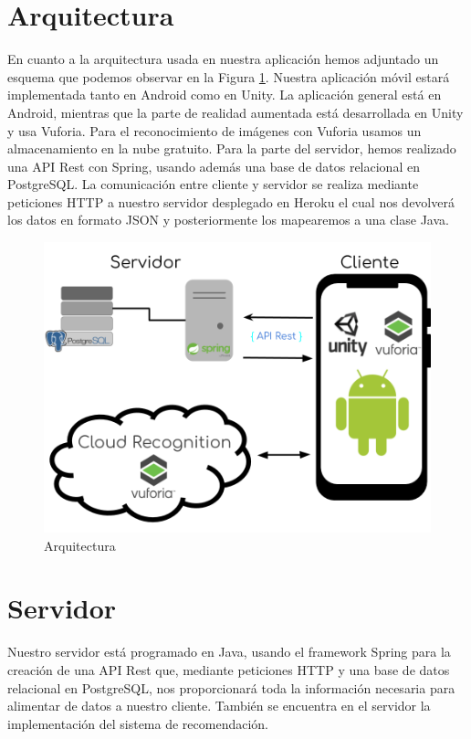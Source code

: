 \section{Arquitectura}
\label{makereference4.2}
En cuanto a la arquitectura usada en nuestra aplicación hemos adjuntado un esquema que podemos observar en la Figura \ref{fig:arquitectura}. Nuestra aplicación móvil estará implementada tanto en Android
como en Unity. La aplicación general está en Android, mientras que la parte de realidad aumentada está desarrollada en Unity y usa Vuforia. Para el reconocimiento
de imágenes con Vuforia usamos un almacenamiento en la nube gratuito.
Para la parte del servidor, hemos realizado una API Rest con Spring, usando además una base de datos relacional en PostgreSQL. La comunicación entre cliente y servidor se realiza mediante peticiones HTTP a 
nuestro servidor desplegado en Heroku el cual nos devolverá los datos en formato JSON y posteriormente los mapearemos a una clase Java.
\begin{figure}[H]
    \centering
    \includegraphics[width=6in]{figures/chapter-4/arquitectura.png}
    \caption{Arquitectura}
    \label{fig:arquitectura}
\end{figure}
\section{Servidor}
\label{makereference4.3}
Nuestro servidor está programado en Java, usando el framework Spring para la creación de una API Rest que, mediante peticiones HTTP y una base de datos relacional en PostgreSQL, nos proporcionará
toda la información necesaria para alimentar de datos a nuestro cliente. También se encuentra en el servidor la implementación del sistema de recomendación.
